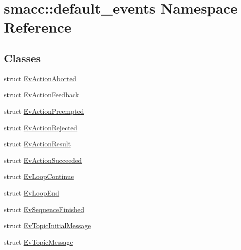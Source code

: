\hypertarget{namespacesmacc_1_1default__events}{}\section{smacc\+:\+:default\+\_\+events Namespace Reference}
\label{namespacesmacc_1_1default__events}
\subsection*{Classes}
\begin{DoxyCompactItemize}
\item 
struct \hyperlink{structsmacc_1_1default__events_1_1EvActionAborted}{Ev\+Action\+Aborted}
\item 
struct \hyperlink{structsmacc_1_1default__events_1_1EvActionFeedback}{Ev\+Action\+Feedback}
\item 
struct \hyperlink{structsmacc_1_1default__events_1_1EvActionPreempted}{Ev\+Action\+Preempted}
\item 
struct \hyperlink{structsmacc_1_1default__events_1_1EvActionRejected}{Ev\+Action\+Rejected}
\item 
struct \hyperlink{structsmacc_1_1default__events_1_1EvActionResult}{Ev\+Action\+Result}
\item 
struct \hyperlink{structsmacc_1_1default__events_1_1EvActionSucceeded}{Ev\+Action\+Succeeded}
\item 
struct \hyperlink{structsmacc_1_1default__events_1_1EvLoopContinue}{Ev\+Loop\+Continue}
\item 
struct \hyperlink{structsmacc_1_1default__events_1_1EvLoopEnd}{Ev\+Loop\+End}
\item 
struct \hyperlink{structsmacc_1_1default__events_1_1EvSequenceFinished}{Ev\+Sequence\+Finished}
\item 
struct \hyperlink{structsmacc_1_1default__events_1_1EvTopicInitialMessage}{Ev\+Topic\+Initial\+Message}
\item 
struct \hyperlink{structsmacc_1_1default__events_1_1EvTopicMessage}{Ev\+Topic\+Message}
\end{DoxyCompactItemize}
